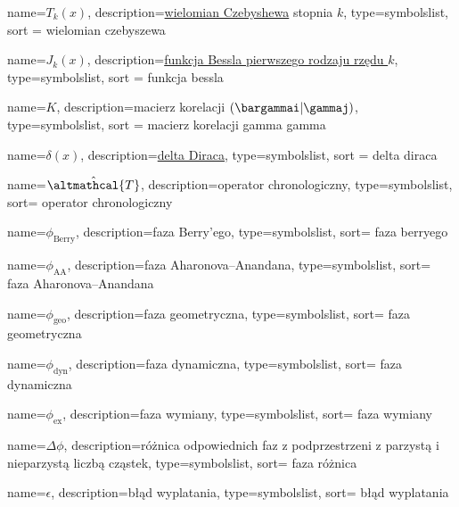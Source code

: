 {
    name=\ensuremath{T_k(x)},
    description={\href{https://pl.wikipedia.org/wiki/Wielomiany_Czebyszewa}{wielomian Czebyshewa} stopnia $k$},
    type=symbolslist,
    sort = wielomian czebyszewa
}

{
    name=\ensuremath{J_k(x)},
    description={\href{https://pl.wikipedia.org/wiki/Funkcje_Bessela\#Funkcje_Bessela_pierwszego_rodzaju}{funkcja Bessla pierwszego rodzaju rzędu $k$}},
    type=symbolslist,
    sort = funkcja bessla
}


{
    name=\ensuremath{K},
    description={macierz korelacji $(\bargammai|\gammaj)$},
    type=symbolslist,
    sort = macierz korelacji gamma gamma
}

{
    name=\ensuremath{\delta(x)},
    description={\href{https://pl.wikipedia.org/wiki/Delta_Diraca}{delta Diraca}},
    type=symbolslist,
    sort = delta diraca
}

{
    name=\ensuremath{\hat{\altmathcal{T}}},
    description={operator chronologiczny},
    type=symbolslist,
    sort= operator chronologiczny
}


{
    name=\ensuremath{\phi_{\mathrm{Berry}}},
    description={faza Berry'ego},
    type=symbolslist,
    sort= faza berryego
}

{
    name=\ensuremath{\phi_{\mathrm{AA}}},
    description={faza Aharonova--Anandana},
    type=symbolslist,
    sort= faza Aharonova--Anandana
}

{
    name=\ensuremath{\phi_{\mathrm{geo}}},
    description={faza geometryczna},
    type=symbolslist,
    sort= faza geometryczna
}

{
    name=\ensuremath{\phi_{\mathrm{dyn}}},
    description={faza dynamiczna},
    type=symbolslist,
    sort= faza dynamiczna
}

{
    name=\ensuremath{\phi_{\mathrm{ex}}},
    description={faza wymiany},
    type=symbolslist,
    sort= faza wymiany
}

{
    name=\ensuremath{\Delta\phi},
    description={różnica odpowiednich faz z podprzestrzeni z parzystą i nieparzystą liczbą cząstek},
    type=symbolslist,
    sort= faza różnica 
}

{
    name=\ensuremath{\epsilon},
    description={błąd wyplatania},
    type=symbolslist,
    sort= błąd wyplatania
}

